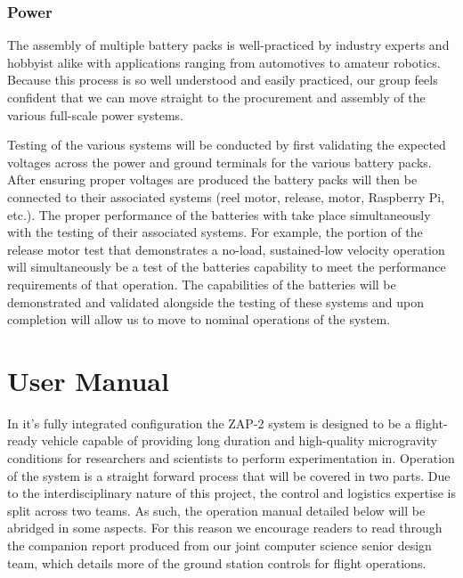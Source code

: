 
\subsubsection{Power}

\indent\indent The assembly of multiple battery packs is well-practiced by industry experts and hobbyist alike with applications ranging from automotives to amateur robotics. Because this process is so well understood and easily practiced, our group feels confident that we can move straight to the procurement and assembly of the various full-scale power systems. 

Testing of the various systems will be conducted by first validating the expected voltages across the power and ground terminals for the various battery packs. After ensuring proper voltages are produced the battery packs will then be connected to their associated systems (reel motor, release, motor, Raspberry Pi, etc.). The proper performance of the batteries with take place simultaneously with the testing of their associated systems. For example, the portion of the release motor test that demonstrates a no-load, sustained-low velocity operation will simultaneously be a test of the batteries capability to meet the performance requirements of that operation. The capabilities of the batteries will be demonstrated and validated alongside the testing of these systems and upon completion will allow us to move to nominal operations of the system. 



\section{User Manual}

\indent\indent In it's fully integrated configuration the ZAP-2 system is designed to be a flight-ready vehicle capable of providing long duration and high-quality microgravity conditions for researchers and scientists to perform experimentation in. Operation of the system is a straight forward process that will be covered in two parts. Due to the interdisciplinary nature of this project, the control and logistics expertise is split across two teams. As such, the operation manual detailed below will be abridged in some aspects. For this reason we encourage readers to read through the companion report produced from our joint computer science senior design team, which details more of the ground station controls for flight operations. 

